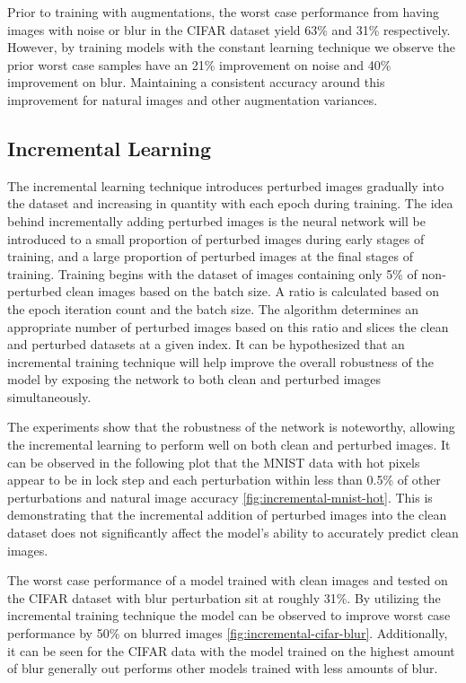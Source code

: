 \documentclass[conference]{IEEEtran}
\begin{document}
Prior to training with augmentations, the worst case performance from having images with noise or blur in the CIFAR dataset yield 63\% and 31\% respectively. However, by training models with the constant learning technique we observe the prior worst case samples have an 21\% improvement on noise and 40\% improvement on blur. Maintaining a consistent accuracy around this improvement for natural images and other augmentation variances.

\subsection{Incremental Learning}

The incremental learning technique introduces perturbed images gradually into the dataset and increasing in quantity with each epoch during training. The idea behind incrementally adding perturbed images is the neural network will be introduced to a small proportion of perturbed images during early stages of training, and a large proportion of perturbed images at the final stages of training. Training begins with the dataset of images containing only 5\% of non-perturbed clean images based on the batch size. A ratio is calculated based on the epoch iteration count and the batch size. The algorithm determines an appropriate number of perturbed images based on this ratio and slices the clean and perturbed datasets at a given index. It can be hypothesized that an incremental training technique will help improve the overall robustness of the model by exposing the network to both clean and perturbed images simultaneously.

The experiments show that the robustness of the network is noteworthy, allowing the incremental learning to perform well on both clean and perturbed images. It can be observed in the following plot that the MNIST data with hot pixels appear to be in lock step and each perturbation within less than 0.5\% of other perturbations and natural image accuracy \autoref{fig:incremental-mnist-hot}. This is demonstrating that the incremental addition of perturbed images into the clean dataset does not significantly affect the model’s ability to accurately predict clean images.

The worst case performance of a model trained with clean images and tested on the CIFAR dataset with blur perturbation sit at roughly 31\%. By utilizing the incremental training technique the model can be observed to improve worst case performance by 50\% on blurred images \autoref{fig:incremental-cifar-blur}. Additionally, it can be seen for the CIFAR data with the model trained on the highest amount of blur generally out performs other models trained with less amounts of blur.
\end{document}
